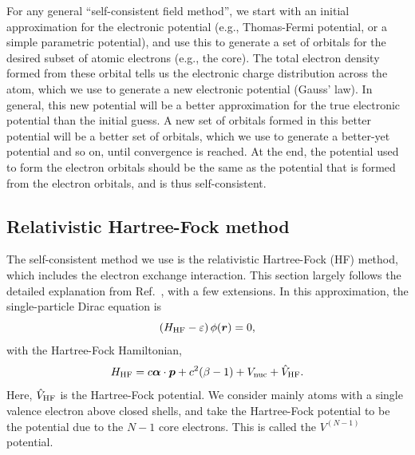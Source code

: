 \documentclass[10pt,twocolumn,a4paper]{article}%
\renewcommand{\v}[1]{\ensuremath{\boldsymbol{#1}}}		%
\newcommand{\be}{\begin{equation}}
\newcommand{\ee}{\end{equation}}
\def\en{\ensuremath{\varepsilon}}
\begin{document}
For any general ``self-consistent field method'', we start with an initial approximation for the electronic potential (e.g., Thomas-Fermi potential, or a simple parametric potential), and use this to generate a set of orbitals for the desired subset of atomic electrons (e.g., the core).
The total electron density formed from these orbital tells us the electronic charge distribution across the atom, which we use to generate a new electronic potential (Gauss' law).
In general, this new potential will be a better approximation for the true electronic potential than the initial guess.
A new set of orbitals formed in this better potential will be a better set of orbitals, which we use to generate a better-yet potential and so on, until convergence is reached.
At the end, the potential used to form the electron orbitals should be the same as the potential that is formed from the electron orbitals, and is thus self-consistent.

\subsection{Relativistic Hartree-Fock method}

The self-consistent method we use is the relativistic Hartree-Fock (HF) method, which includes the electron exchange interaction.
This section largely follows the detailed explanation from Ref.~\cite{JohnsonBook2007}, with a few extensions.
In this approximation, the single-particle Dirac equation is
\be\label{eq:HF}
\left(H_{\rm HF} - \en\right) \phi(\v{r}) = 0,
\ee
with the Hartree-Fock Hamiltonian,
\be\label{eq:H-HF}
H_{\rm HF}  = c \v{\alpha}\cdot\v{p} + c^2(\beta-1) +  V_{\rm nuc} +  \hat V_{\rm HF}.
\ee
Here, $\hat V_{\rm HF}$ is the Hartree-Fock potential.
We consider mainly atoms with a single valence electron above closed shells, and take the Hartree-Fock potential to be the potential due to the $N-1$ core electrons.
This is called the $V^{(N-1)}$ potential. 
\end{document}

